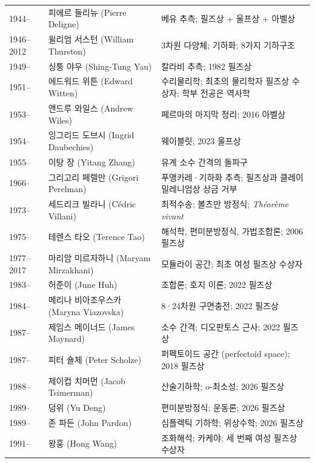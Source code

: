 \begin{center}
\begin{longtable}{@{}L{0.16\textwidth}L{0.24\textwidth}L{0.52\textwidth}@{}}
1944-- & 피에르 들리뉴 (Pierre Deligne) & 베유 추측; 필즈상 + 울프상 + 아벨상\\
1946--2012 & 윌리엄 서스턴 (William Thurston) & 3차원 다양체; 기하화; 8가지 기하구조\\
1949-- & 싱퉁 야우 (Shing-Tung Yau) & 칼라비 추측; 1982 필즈상\\
1951-- & 에드워드 위튼 (Edward Witten) & 수리물리학; 최초의 물리학자 필즈상 수상자; 학부 전공은 역사학\\
1953-- & 앤드루 와일스 (Andrew Wiles) & 페르마의 마지막 정리; 2016 아벨상\\
1954-- & 잉그리드 도브시 (Ingrid Daubechies) & 웨이블릿; 2023 울프상\\
1955-- & 이탕 장 (Yitang Zhang) & 유계 소수 간격의 돌파구\\
1966-- & 그리고리 페렐만 (Grigori Perelman) & 푸앵카레·기하화 추측; 필즈상과 클레이 밀레니엄상 상금 거부\\
1973-- & 세드리크 빌라니 (Cédric Villani) & 최적수송; 볼츠만 방정식; \textit{Théorème vivant}\\
1975-- & 테렌스 타오 (Terence Tao) & 해석학, 편미분방정식, 가법조합론; 2006 필즈상\\
1977--2017 & 마리암 미르자하니 (Maryam Mirzakhani) & 모듈라이 공간; 최초 여성 필즈상 수상자\\
1983-- & 허준이 (June Huh) & 조합론; 호지 이론; 2022 필즈상\\
1984-- & 메리나 비아조우스카 (Maryna Viazovska) & 8·24차원 구면충전; 2022 필즈상\\
1987-- & 제임스 메이너드 (James Maynard) & 소수 간격; 디오판토스 근사; 2022 필즈상\\
1987-- & 피터 숄체 (Peter Scholze) & 퍼펙토이드 공간 (perfectoid space); 2018 필즈상\\
1988-- & 제이컵 치머먼 (Jacob Tsimerman) & 산술기하학; o-최소성; 2026 필즈상\\
1989-- & 덩위 (Yu Deng) & 편미분방정식; 운동론; 2026 필즈상\\
1989-- & 존 파든 (John Pardon) & 심플렉틱 기하학; 위상수학; 2026 필즈상\\
1991-- & 왕훙 (Hong Wang) & 조화해석; 카케야; 세 번째 여성 필즈상 수상자\\
\end{longtable}
\end{center}


